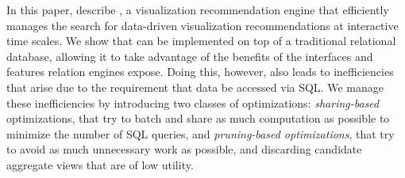 


In this paper, describe \SeeDB,
a visualization recommendation engine that efficiently manages the search
for data-driven visualization recommendations at interactive time scales.
We show that \SeeDB can be implemented on top of a traditional relational database,
allowing it to take advantage of the benefits of the interfaces and features
relation engines expose.
Doing this, however,
also leads to inefficiencies that arise due to the requirement that data be
accessed via SQL.   
We manage these inefficiencies by introducing two classes of optimizations:
{\em sharing-based} optimizations, that try to batch
and share as much computation as possible to minimize the number of SQL queries,
and {\em pruning-based optimizations}, that try to avoid
as much unnecessary work as possible, and discarding candidate aggregate views
that are of low utility.

